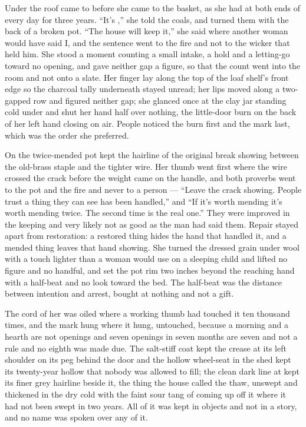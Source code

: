 \scenebreak

Under the roof  came to  before she came to the basket, as she had at both ends of every day for three years. “It's ,” she told the coals, and turned them with the back of a broken pot. “The house will keep it,” she said where another woman would have said I, and the sentence went to the fire and not to the wicker that held him. She stood a moment counting a small intake, a hold and a letting-go toward no opening, and gave neither gap a figure, so that the count went into the room and not onto a slate. Her finger lay along the top of the loaf shelf's front edge so the charcoal tally underneath stayed unread; her lips moved along a two-gapped row and figured neither gap; she glanced once at the clay jar standing cold under  and shut her hand half over nothing, the little-door burn on the back of her left hand closing on air. People noticed the burn first and the mark last, which was the order she preferred.

On  the twice-mended pot kept the hairline of the original break showing between the old-brass staple and the tighter wire. Her thumb went first where the wire crossed the crack before the weight came on the handle, and both proverbs went to the pot and the fire and never to a person — “Leave the crack showing. People trust a thing they can see has been handled,” and “If it's worth mending it's worth mending twice. The second time is the real one.” They were improved in the keeping and very likely not as good as the man had said them. Repair stayed apart from restoration: a restored thing hides the hand that handled it, and a mended thing leaves that hand showing. She turned the dressed grain under wool with a touch lighter than a woman would use on a sleeping child and lifted no figure and no handful, and set the pot rim two inches beyond the reaching hand with a half-beat and no look toward the bed. The half-beat was the distance between intention and arrest, bought at nothing and not a gift.

The cord of her  was oiled where a working thumb had touched it ten thousand times, and the mark hung where it hung, untouched, because a morning and a hearth are not openings and seven openings in seven months are seven and not a rule and no eighth was made due. The salt-stiff coat kept the crease at its left shoulder on its peg behind the door and the hollow wheel-seat in the shed kept its twenty-year hollow that nobody was allowed to fill; the clean dark line at  kept its finer grey hairline beside it, the thing the house called the thaw, unswept and thickened in the dry cold with the faint sour tang of  coming up off it where it had not been swept in two years. All of it was kept in objects and not in a story, and no name was spoken over any of it.

